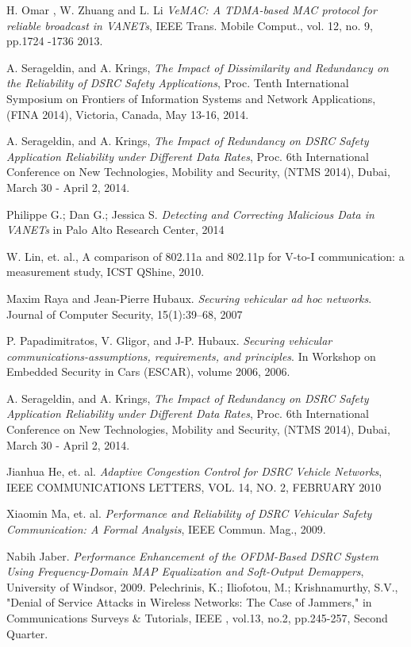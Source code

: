 \documentclass[conference]{IEEEtran}
\begin{document}
\begin{thebibliography}{1}

	H. Omar , W. Zhuang and L. Li {\em VeMAC: A TDMA-based MAC protocol for reliable broadcast in VANETs}, IEEE Trans. Mobile Comput.,  vol. 12,  no. 9,  pp.1724 -1736 2013.	
	
	A. Serageldin, and A. Krings, {\em The Impact of Dissimilarity and Redundancy on the Reliability of DSRC Safety Applications}, Proc. Tenth International Symposium on Frontiers of Information Systems and Network Applications, (FINA 2014), Victoria, Canada, May 13-16, 2014.
	
	A. Serageldin, and A. Krings, {\em The Impact of Redundancy on DSRC Safety Application Reliability under Different Data Rates}, Proc. 6th International Conference on New Technologies, Mobility and Security, (NTMS 2014), Dubai, March 30 - April 2, 2014.
	
	
Philippe G.; Dan G.; Jessica S. {\em Detecting and Correcting Malicious Data in VANETs} in Palo Alto Research Center, 2014
	
	W. Lin, et. al., A comparison of 802.11a and 802.11p for V-to-I
communication: a measurement study, ICST QShine, 2010.
	

	Maxim Raya and Jean-Pierre Hubaux. {\em Securing vehicular ad hoc networks}.
Journal of Computer Security, 15(1):39–68, 2007
	
	P. Papadimitratos, V. Gligor, and J-P. Hubaux. {\em Securing vehicular
communications-assumptions, requirements, and principles}. In Workshop on
Embedded Security in Cars (ESCAR), volume 2006, 2006.



	A. Serageldin, and A. Krings, {\em The Impact of Redundancy on DSRC Safety Application Reliability under Different Data Rates}, Proc. 6th International Conference on New Technologies, Mobility and Security, (NTMS 2014), Dubai, March 30 - April 2, 2014.
	
	Jianhua He, et. al. {\em Adaptive Congestion Control for DSRC Vehicle Networks}, IEEE COMMUNICATIONS LETTERS, VOL. 14, NO. 2, FEBRUARY 2010
	
	Xiaomin Ma, et. al. {\em Performance and Reliability of DSRC Vehicular Safety Communication: A Formal Analysis}, IEEE Commun. Mag., 2009.
	
	Nabih Jaber. {\em Performance Enhancement of the OFDM-Based DSRC System Using Frequency-Domain MAP Equalization and Soft-Output Demappers}, University of Windsor, 2009.
	Pelechrinis, K.; Iliofotou, M.; Krishnamurthy, S.V., "Denial of Service Attacks in Wireless Networks: The Case of Jammers," in Communications Surveys \& Tutorials, IEEE , vol.13, no.2, pp.245-257, Second Quarter.


\end{thebibliography}
\end{document}
